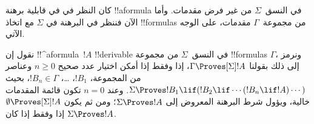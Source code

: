 \documentclass[../../../include/open-logic-section]{subfiles}
\begin{document}


كان النظر في  في قابلية برهنة !!a{formula}
في النسق~$\Sigma$ من غير فرض مقدمات. وأما الآن فننظر في البرهنة في
$\Sigma$ مع اتخاذ !!{formula}s من مجموعة~$\Gamma$ مقدمات، على الوجه الآتي.

\begin{defn}
  نقول إن !!^a{formula}~$!A$ !!{derivable} في النسق~$\Sigma$ من مجموعة
  !!{formula}s $\Gamma$، ونرمز إلى ذلك بقولنا $\Gamma \Proves[\Sigma] !A$،
  إذا وفقط إذا أمكن اختيار عدد صحيح $n \geq 0$ وعناصر من المجموعة،
  $!B_1$، \dots، $!B_n \in \Gamma$، بحيث
  $\Sigma \Proves !B_1 \lif (!B_2 \lif \cdots (!B_n \lif !A)
  \cdots)$.
  وعند $n=0$ تكون قائمة المقدمات خالية، ويؤول شرط البرهنة المعروض إلى
  $\Sigma \Proves !A$؛ ومن ثم يكون
  $\emptyset \Proves[\Sigma] !A$ إذا وفقط إذا كان $\Sigma \Proves !A$.
\end{defn}
\end{document}
